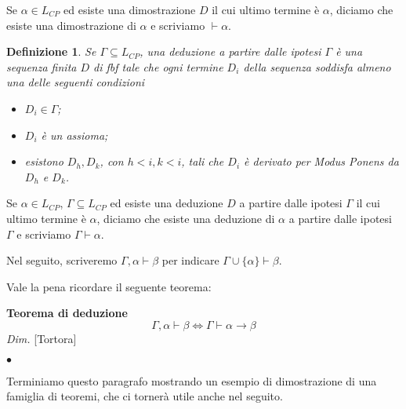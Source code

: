 \documentclass[a4paper, 12pt]{article}
\newtheorem{definition}{Definizione}
\begin{document}
Se $\alpha \in L_{CP}$ ed esiste una dimostrazione $D$ il cui ultimo termine è $\alpha$,
diciamo che esiste una dimostrazione di $\alpha$ e scriviamo $\vdash \alpha$.


\begin{definition}
Se $\Gamma \subseteq L_{CP}$, una deduzione a partire dalle ipotesi $\Gamma$ è una sequenza finita $D$
di fbf tale che ogni termine $D_i$ della sequenza soddisfa almeno una delle seguenti condizioni
\begin{itemize}
\item $D_i \in \Gamma$;
\item $D_i$ è un assioma;
\item esistono $D_h, D_k$, con $h < i, k < i$, tali che $D_i$ è derivato per \textit{Modus Ponens}
da $D_h$ e $D_k$.
\end{itemize}
\end{definition}

Se $\alpha \in L_{CP}$, $\Gamma \subseteq L_{CP}$ ed esiste una deduzione $D$ a partire dalle ipotesi $\Gamma$
il cui ultimo termine è $\alpha$, diciamo che esiste una deduzione di $\alpha$
a partire dalle ipotesi $\Gamma$ e scriviamo $\Gamma \vdash \alpha$.

Nel seguito, scriveremo $\Gamma, \alpha \vdash \beta$
per indicare $\Gamma \cup \{\alpha\} \vdash \beta$.

Vale la pena ricordare il seguente teorema:
\begin{flushleft}
\textbf{Teorema di deduzione}
$$\Gamma, \alpha \vdash \beta \Leftrightarrow \Gamma \vdash \alpha \rightarrow \beta$$
\textit{Dim.} [Tortora]
\begin{flushright}
$\bullet$
\end{flushright}
\end{flushleft}


Terminiamo questo paragrafo mostrando un esempio di dimostrazione di una famiglia
di teoremi, che ci tornerà utile anche nel seguito.
\end{document}
